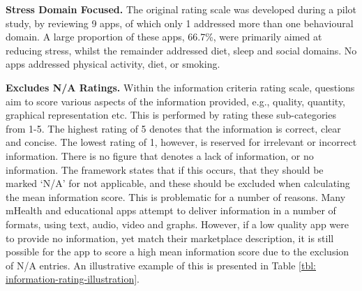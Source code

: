 \textbf{Stress Domain Focused.}
The original rating scale was developed during a pilot study, by reviewing 9 apps, of which only 1 addressed more than one behavioural domain. A large proportion of these apps, 66.7\%, were primarily aimed at reducing stress, whilst the remainder addressed diet, sleep and social domains. No apps addressed physical activity, diet, or smoking.

\textbf{Excludes N/A Ratings.}
Within the information criteria rating scale, questions aim to score various aspects of the information provided, e.g., quality, quantity, graphical representation etc. This is performed by rating these sub-categories from 1-5. The highest rating of 5 denotes that the information is correct, clear and concise. The lowest rating of 1, however, is reserved for irrelevant or incorrect information. There is no figure that denotes a lack of information, or no information. The framework states that if this occurs, that they should be marked `N/A' for not applicable, and these should be excluded when calculating the mean information score. This is problematic for a number of reasons.
Many mHealth and educational apps attempt to deliver information in a number of formats, using text, audio, video and graphs. However, if a low quality app were to provide no information, yet match their marketplace description, it is still possible for the app to score a high mean information score due to the exclusion of N/A entries. An illustrative example of this is presented in Table \ref{tbl: information-rating-illustration}.

\begin{table}[]
\centering
\caption{Example of N/A label bias on mean information score.}
\label{tbl: information-rating-illustration}
\end{table}

